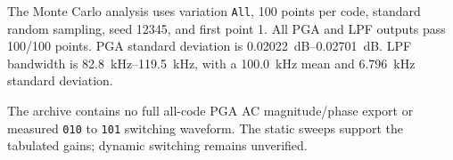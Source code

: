 The Monte Carlo analysis uses variation \texttt{All}, 100 points per code, standard random sampling, seed 12345, and first point 1. All PGA and LPF outputs pass 100/100 points. PGA standard deviation is \SIrange{0.02022}{0.02701}{dB}. LPF bandwidth is \SIrange{82.8}{119.5}{kHz}, with a \SI{100.0}{kHz} mean and \SI{6.796}{kHz} standard deviation.

The archive contains no full all-code PGA AC magnitude/phase export or measured \texttt{010} to \texttt{101} switching waveform. The static sweeps support the tabulated gains; dynamic switching remains unverified.
